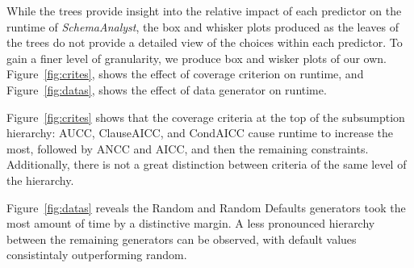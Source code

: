 
While the trees provide insight into the relative impact of each predictor on the runtime of \textit{SchemaAnalyst}, the
box and whisker plots produced as the leaves of the trees do not provide a detailed view of the choices within each
predictor.  To gain a finer level of granularity, we produce box and wisker plots of our own.  Figure~\ref{fig:crites},
shows the effect of coverage criterion on runtime, and Figure~\ref{fig:datas}, shows the effect of data generator on
runtime.

Figure~\ref{fig:crites} shows that the coverage criteria at the top of the subsumption hierarchy: AUCC, ClauseAICC, and
CondAICC cause runtime to increase the most, followed by ANCC and AICC, and then the remaining constraints.
Additionally, there is not a great distinction between criteria of the same level of the hierarchy.

Figure~\ref{fig:datas} reveals the Random and Random Defaults generators took the most amount of time by a distinctive
margin. A less pronounced hierarchy between the remaining generators can be observed, with default values consistintaly
outperforming random.

